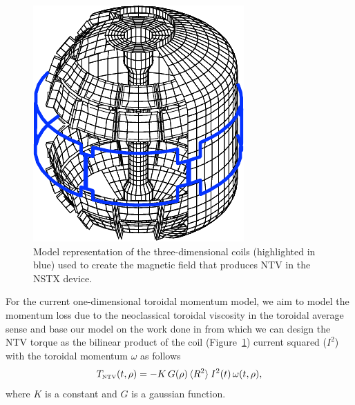 \documentclass[12pt]{iopart}
\begin{document}
\begin{figure}
	\centering
   \includegraphics{imene_figs/pic_NTV}
\caption{Model representation of the three-dimensional coils (highlighted in blue) used to create the magnetic field that produces NTV in the NSTX device.}
  \label{pic_NTV}
\end{figure}
For the current one-dimensional toroidal momentum model, we aim to model the momentum loss due to the neoclassical toroidal viscosity in the toroidal average sense and base our model on the work done in \cite{Zhu06} from which we can design the NTV torque as the bilinear product of the coil (Figure~\ref{pic_NTV}) current squared ($ I^2$) with the toroidal momentum $\omega$ as follows
\begin{equation}
   T_\textrm{\tiny NTV}  (t, \rho) =  - K \, G(\rho) \,  \langle R^2 \rangle \:  I^2(t) \,\omega (t, \rho),
    \label{eqn:ntv}
\end{equation}
where $K$ is a constant and $G$ is a gaussian function.
\end{document}
